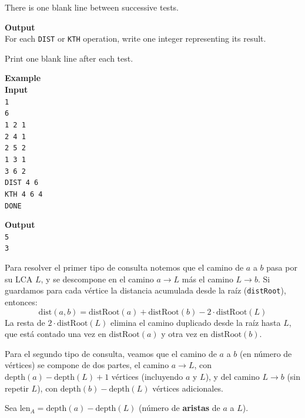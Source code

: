 \begin{center}
{\begin{minipage}{0.95\linewidth}
There is one blank line between successive tests.

\vspace{0.5em}
\textbf{Output}\\
For each \texttt{DIST} or \texttt{KTH} operation, write one integer representing its result.

Print one blank line after each test.

\vspace{0.5em}
\textbf{Example}\\
\textbf{Input}\\
\texttt{1}\\
\texttt{6}\\
\texttt{1 2 1}\\
\texttt{2 4 1}\\
\texttt{2 5 2}\\
\texttt{1 3 1}\\
\texttt{3 6 2}\\
\texttt{DIST 4 6}\\
\texttt{KTH 4 6 4}\\
\texttt{DONE}

\textbf{Output}\\
\texttt{5}\\
\texttt{3}
\end{minipage}
}
\end{center}

 Para resolver el primer tipo de consulta notemos que el camino de $a$ a $b$ pasa por su LCA $L$, y se descompone en el camino $a \to L$ más el camino $L \to b$. Si guardamos para cada vértice la distancia acumulada desde la raíz
(\texttt{distRoot}), entonces:
\[
\text{dist}(a,b) = \text{distRoot}(a) + \text{distRoot}(b) -
2\cdot\text{distRoot}(L)
\]
La resta de $2\cdot\text{distRoot}(L)$ elimina el camino duplicado desde la raíz hasta $L$, que está contado una vez en $\text{distRoot}(a)$ y otra vez en $\text{distRoot}(b)$.
 
Para el segundo tipo de consulta, veamos que el camino de $a$ a $b$ (en número de vértices) se compone de dos partes, el camino $a \to L$, con $\text{depth}(a) - \text{depth}(L) + 1$ vértices (incluyendo $a$ y $L$), y del camino $L \to b$ (sin repetir $L$), con $\text{depth}(b) - \text{depth}(L)$ vértices adicionales.
 
Sea $\text{len}_A = \text{depth}(a) - \text{depth}(L)$ (número
de \textbf{aristas} de $a$ a $L$).
 
